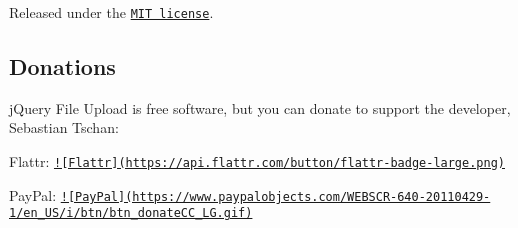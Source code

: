 Released under the \href{http://www.opensource.org/licenses/MIT}{\tt M\-I\-T license}.

\subsection*{Donations}

j\-Query File Upload is free software, but you can donate to support the developer, Sebastian Tschan\-:

Flattr\-: \href{https://flattr.com/thing/286433/jQuery-File-Upload-Plugin}{\tt !\mbox{[}Flattr\mbox{]}(https\-://api.\-flattr.\-com/button/flattr-\/badge-\/large.\-png)}

Pay\-Pal\-: \href{https://www.paypal.com/cgi-bin/webscr?cmd=_s-xclick&hosted_button_id=PYWYSYP77KL54}{\tt !\mbox{[}Pay\-Pal\mbox{]}(https\-://www.\-paypalobjects.\-com/\-W\-E\-B\-S\-C\-R-\/640-\/20110429-\/1/en\-\_\-\-U\-S/i/btn/btn\-\_\-donate\-C\-C\-\_\-\-L\-G.\-gif)} 
